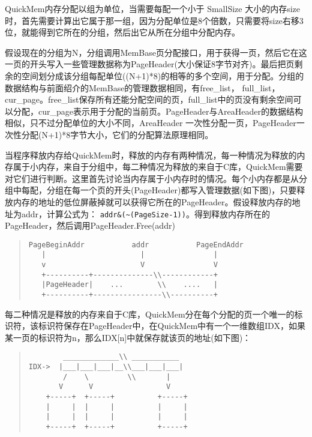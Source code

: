 QuickMem内存分配以组为单位，当需要每配一个小于 SmallSize 大小的内存size时，首先需要计算出它属于那一组，因为分配单位是8个倍数，只需要将size右移3位，就能得到它所在的分组，然后出它从所在分组中分配内存。

假设现在的分组为N，分组调用MemBase页分配接口，用于获得一页，然后它在这一页的开头写入一些管理数据称为PageHeader(大小保证8字节对齐)。最后把页剩余的空间划分成该分组每配单位((N+1)*8)的相等的多个空间，用于分配。分组的数据结构与前面绍介的MemBase的管理数据相同，有free\_list， full\_list，cur\_page。free\_list保存所有还能分配空间的页，full\_list中的页没有剩余空间可以分配，cur\_page表示用于分配的当前页。PageHeader与AreaHeader的数据结构相似，只不过分配单位的大小不同，AreaHeader 一次性分配一页，PageHeader一次性分配(N+1)*8字节大小，它们的分配算法原理相同。

当程序释放内存给QuickMem时，释放的内存有两种情况，每一种情况为释放的内存属于小内存，来自于分组中，每二种情况为释放的来自于C库，QuickMem需要对它们进行判断。这里首先讨论当内存属于小内存时的情况。每个小内存都是从分组中每配，分组在每一个页的开头(PageHeader)都写入管理数据(如下图)，只要释放内存的地址的低位屏蔽掉就可以获得它所在的PageHeader。假设释放内存的地址为addr，计算公式为： \verb|addr&(~(PageSize-1))|。得到释放内存所在的PageHeader，然后调用PageHeader.Free(addr)
\begin{quote}
\begin{verbatim}
PageBeginAddr           addr           PageEndAddr
   |                      |                |
   v                      V                V
   +----------+--------------\\------------+
   |PageHeader|    ...        \\    ....   |
   +----------+----------------\\----------+
\end{verbatim}
\end{quote}
每二种情况是释放的内存来自于C库，QuickMem分在每个分配的页一个唯一的标识符，该标识符保存在PageHeader中，在QuickMem中有一个一维数组IDX，如果某一页的标识符为n，那么IDX[n]中就保存就该页的地址(如下图)：
\begin{quote}
\begin{verbatim}
        _____________\\ ___________
IDX->  |___|___|___|__\\___|___|___|
        /    \         \\       |
       V      V                 V
    +-----+  +-----+          +-----+
    |     |  |     |          |     |
    |     |  |     |          |     |
    +-----+  +-----+          +-----+
\end{verbatim}
\end{quote}
